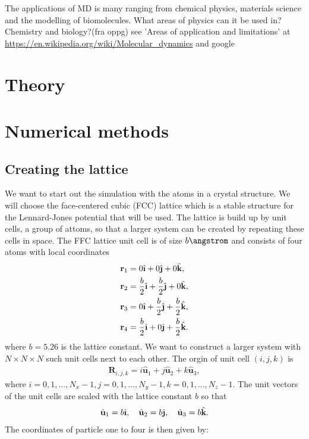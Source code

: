 \documentclass[11pt,a4wide]{article}
\renewcommand{\vec}{\mathbf}
\newcommand{\ihat}{\hat{\textbf{\i}}}
\newcommand{\jhat}{\hat{\textbf{\j}}}
\newcommand{\khat}{\hat{\textbf{k}}}
\begin{document}
The applications of MD is many ranging from chemical physics, materials science and the modelling of biomolecules.
What areas of physics can it be used in? Chemistry and biology?(fra oppg)
see 'Areas of application and limitations' at \url{https://en.wikipedia.org/wiki/Molecular\_dynamics} and google




\section{Theory}


\section{Numerical methods}


\subsection{Creating the lattice} \label{sec: creating_lattice_theory}
We want to start out the simulation with the atoms in a crystal structure. We will choose the face-centered cubic (FCC) lattice which is a stable structure for the Lennard-Jones potential that will be used. The lattice is build up by unit cells, a group of attoms, so that a larger system can be created by repeating these cells in space. The FFC lattice unit cell is of size $b \angstrom $ and consists of four atoms with local coordinates
\begin{align}
	\vec r_1 &= 0 \ihat + 0 \jhat + 0 \khat,\\
	\vec r_2 &= \frac{b}{2} \ihat + \frac{b}{2} \jhat + 0 \khat,\\
	\vec r_3 &= 0 \ihat + \frac{b}{2} \jhat + \frac{b}{2} \khat,\\
	\vec r_4 &= \frac{b}{2} \ihat + 0 \jhat + \frac{b}{2} \khat.
\end{align}
where $b=5.26$ is the lattice constant. We want to construct a larger system with $N\times N\times N$ such unit cells next to each other. The orgin of unit cell $(i,j,k)$ is
\begin{align}
	\vec R_{i,j,k} = i \hat{\textbf{u}}_1 + j \hat{\textbf{u}}_2 + k \hat{\textbf{u}}_3,
\end{align}
where $i=0,1,..., N_x-1, j=0,1,..., N_y-1, k=0,1,..., N_z-1$. The unit vectors of the unit cells are scaled with the lattice constant $b$ so that
\begin{align}
	\hat{\textbf{u}}_1 = b\ihat, \quad \hat{\textbf{u}}_2 = b\jhat, \quad \hat{\textbf{u}}_3 = b\khat.
\end{align}
The coordinates of particle one to four is then given by:
\end{document}
